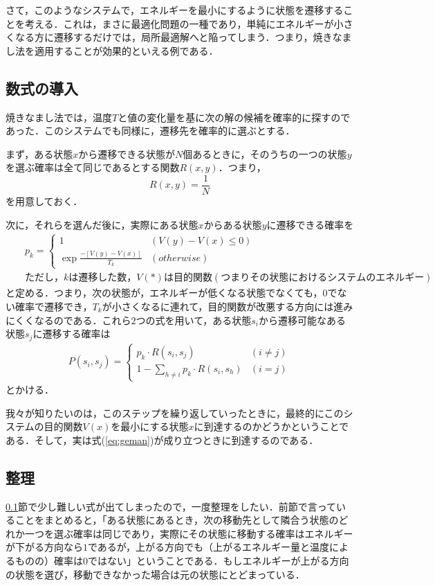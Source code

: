 \documentclass{jarticle}
\begin{document}
さて，このようなシステムで，エネルギーを最小にするように状態を遷移することを考える．これは，まさに最適化問題の一種であり，単純にエネルギーが小さくなる方に遷移するだけでは，局所最適解へと陥ってしまう．つまり，焼きなまし法を適用することが効果的といえる例である．



\subsection{数式の導入}
\label{sec:intro_eq}

焼きなまし法では，温度$T$と値の変化量を基に次の解の候補を確率的に探すのであった．このシステムでも同様に，遷移先を確率的に選ぶとする．

まず，ある状態$x$から遷移できる状態が$N$個あるときに，そのうちの一つの状態$y$を選ぶ確率は全て同じであるとする関数$R(x, y)$．つまり，
\begin{equation}
	R(x, y) = \frac{1}{N}
\end{equation}
を用意しておく．

次に，それらを選んだ後に，実際にある状態$x$からある状態$y$に遷移できる確率を
\begin{eqnarray}
\label{eq:movable}
&&	p_k =
	\begin{cases}
		1 & (V(y) - V(x) \le 0) \\
		\exp  \frac {-[V(y) - V(x)]}{T_k} & (otherwise)
	\end{cases}\\
	&&ただし，kは遷移した数，V(*)は目的関数(つまりその状態におけるシステムのエネルギー)
\end{eqnarray}
と定める．つまり，次の状態が，エネルギーが低くなる状態でなくても，$0$でない確率で遷移でき，$T_k$が小さくなるに連れて，目的関数が改悪する方向には進みにくくなるのである．これら$2$つの式を用いて，ある状態$s_i$から遷移可能なある状態$s_j$に遷移する確率は
\begin{eqnarray}
	P(s_i, s_j) =
	\begin{cases}
		p_k \cdot R(s_i, s_j) & (i \ne j)\\
		1 - \sum_{h \ne i} p_k \cdot R(s_i, s_h) & (i = j)
	\end{cases}
\end{eqnarray}
とかける．


我々が知りたいのは，このステップを繰り返していったときに，最終的にこのシステムの目的関数$V(x)$を最小にする状態$x$に到達するのかどうかということである．そして，実は式(\ref{eq:geman})が成り立つときに到達するのである．


\subsection{整理}
\ref{sec:intro_eq}節で少し難しい式が出てしまったので，一度整理をしたい．前節で言っていることをまとめると，「ある状態にあるとき，次の移動先として隣合う状態のどれか一つを選ぶ確率は同じであり，実際にその状態に移動する確率はエネルギーが下がる方向なら$1$であるが，上がる方向でも（上がるエネルギー量と温度によるものの）確率は$0$ではない」ということである．もしエネルギーが上がる方向の状態を選び，移動できなかった場合は元の状態にとどまっている．
\end{document}
